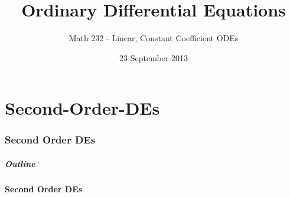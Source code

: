 \part{Second-Order-DEs}
\section{Second Order DEs}

\title{Ordinary Differential Equations}
\subtitle{Math 232 - Linear, Constant Coefficient ODEs}
\date{23 September 2013}

\begin{frame}
  \titlepage
\end{frame}

\begin{frame}
  \frametitle{Outline}
  \tableofcontents[currentsection ]
\end{frame}


\subsection{Second Order DEs}



